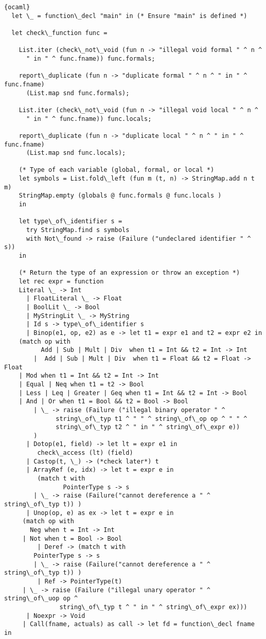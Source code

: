 \begin{lstlisting}{ocaml}
  let \_ = function\_decl "main" in (* Ensure "main" is defined *)

  let check\_function func =

    List.iter (check\_not\_void (fun n -> "illegal void formal " ^ n ^
      " in " ^ func.fname)) func.formals;

    report\_duplicate (fun n -> "duplicate formal " ^ n ^ " in " ^ func.fname)
      (List.map snd func.formals);

    List.iter (check\_not\_void (fun n -> "illegal void local " ^ n ^
      " in " ^ func.fname)) func.locals;

    report\_duplicate (fun n -> "duplicate local " ^ n ^ " in " ^ func.fname)
      (List.map snd func.locals);

    (* Type of each variable (global, formal, or local *)
    let symbols = List.fold\_left (fun m (t, n) -> StringMap.add n t m)
	StringMap.empty (globals @ func.formals @ func.locals )
    in

    let type\_of\_identifier s =
      try StringMap.find s symbols
      with Not\_found -> raise (Failure ("undeclared identifier " ^ s))
    in

    (* Return the type of an expression or throw an exception *)
    let rec expr = function
	Literal \_ -> Int
      | FloatLiteral \_ -> Float
      | BoolLit \_ -> Bool
      | MyStringLit \_ -> MyString
      | Id s -> type\_of\_identifier s
      | Binop(e1, op, e2) as e -> let t1 = expr e1 and t2 = expr e2 in
	(match op with
          Add | Sub | Mult | Div  when t1 = Int && t2 = Int -> Int
        |  Add | Sub | Mult | Div  when t1 = Float && t2 = Float -> Float
	| Mod when t1 = Int && t2 = Int -> Int
	| Equal | Neq when t1 = t2 -> Bool
	| Less | Leq | Greater | Geq when t1 = Int && t2 = Int -> Bool
	| And | Or when t1 = Bool && t2 = Bool -> Bool
        | \_ -> raise (Failure ("illegal binary operator " ^
              string\_of\_typ t1 ^ " " ^ string\_of\_op op ^ " " ^
              string\_of\_typ t2 ^ " in " ^ string\_of\_expr e))
        )
      | Dotop(e1, field) -> let lt = expr e1 in
       	 check\_access (lt) (field)
      | Castop(t, \_) -> (*check later*) t
      | ArrayRef (e, idx) -> let t = expr e in
         (match t with
                PointerType s -> s
		| \_ -> raise (Failure("cannot dereference a " ^ string\_of\_typ t)) )
      | Unop(op, e) as ex -> let t = expr e in
	 (match op with
	   Neg when t = Int -> Int
	 | Not when t = Bool -> Bool
         | Deref -> (match t with
		PointerType s -> s
		| \_ -> raise (Failure("cannot dereference a " ^ string\_of\_typ t)) )
         | Ref -> PointerType(t) 
	 | \_ -> raise (Failure ("illegal unary operator " ^ string\_of\_uop op ^
	  		   string\_of\_typ t ^ " in " ^ string\_of\_expr ex)))
      | Noexpr -> Void
     | Call(fname, actuals) as call -> let fd = function\_decl fname in
     

\end{lstlisting}
